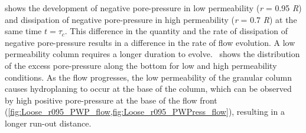  shows the development of negative pore-pressure in low 
permeability (\textit{r} = 0.95 \textit{R}) and dissipation of negative 
pore-pressure in high permeability (\textit{r} = 0.7 \textit{R}) at the same 
time $ t = \tau_c$. This difference in the quantity and the rate of dissipation 
of negative pore-pressure results in a difference in the rate of flow 
evolution. A low permeability column requires a longer duration to 
evolve.~ shows the distribution of the excess 
pore-pressure along the bottom for low and high permeability conditions. As the 
flow progresses, the low permeability of the granular column causes 
hydroplaning to occur at the base of the column, which can be observed by high 
positive pore-pressure at the base of the flow front 
(\cref{fig:Loose_r095_PWP_flow,fig:Loose_r095_PWPress_flow}), resulting in a 
longer run-out distance.
\begin{figure}
\centering
{}\\
\end{figure}
